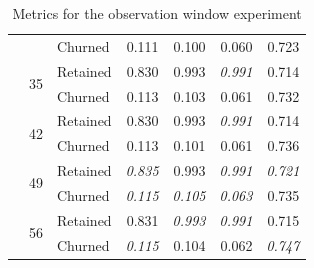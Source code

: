 \documentclass{kththesis}
\begin{document}
\begin{table}
\begin{tabular}{lllrrrr}
     &   & Churned &  0.111 &  0.100 &   0.060 &  0.723 \\
\cline{2-7}
     & \multirow{2}{*}{35} & Retained &  0.830 &  0.993 &   \textit{0.991} &  0.714 \\
     &   & Churned &  0.113 &  0.103 &   0.061 &  0.732 \\
\cline{2-7}
     & \multirow{2}{*}{42} & Retained &  0.830 &  0.993 &   \textit{0.991} &  0.714 \\
     &   & Churned &  0.113 &  0.101 &   0.061 &  0.736 \\
\cline{2-7}
     & \multirow{2}{*}{49} & Retained &  \textit{0.835} &  0.993 &   \textit{0.991} &  \textit{0.721} \\
     &   & Churned &  \textit{0.115} &  \textit{0.105} &   \textit{0.063} &  0.735 \\
\cline{2-7}
     & \multirow{2}{*}{56} & Retained &  0.831 &  \textit{0.993} &   \textit{0.991} &  0.715 \\
     &   & Churned &  \textit{0.115} &  0.104 &   0.062 &  \textit{0.747} \\
\bottomrule
\end{tabular}
\caption{Metrics for the observation window experiment}
\label{tab:obs_window}
\end{table}

\end{document}
